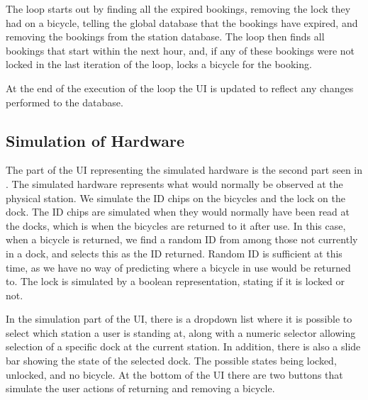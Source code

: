 The loop starts out by finding all the expired bookings, removing the lock they had on a bicycle, telling the global database that the bookings have expired, and removing the bookings from the station database.
The loop then finds all bookings that start within the next hour, and, if any of these bookings were not locked in the last iteration of the loop, locks a bicycle for the booking.

At the end of the execution of the loop the UI is updated to reflect any changes performed to the database.

\subsection{Simulation of Hardware}
The part of the UI representing the simulated hardware is the second part seen in .
The simulated hardware represents what would normally be observed at the physical station.
We simulate the ID chips on the bicycles and the lock on the dock.
The ID chips are simulated when they would normally have been read at the docks, which is when the bicycles are returned to it after use.
In this case, when a bicycle is returned, we find a random ID from among those not currently in a dock, and selects this as the ID returned.
Random ID is sufficient at this time, as we have no way of predicting where a bicycle in use would be returned to.
The lock is simulated by a boolean representation, stating if it is locked or not.

In the simulation part of the UI, there is a dropdown list where it is possible to select which station a user is standing at, along with a numeric selector allowing selection of a specific dock at the current station.
In addition, there is also a slide bar showing the state of the selected dock.
The possible states being locked, unlocked, and no bicycle.
At the bottom of the UI there are two buttons that simulate the user actions of returning and removing a bicycle.

